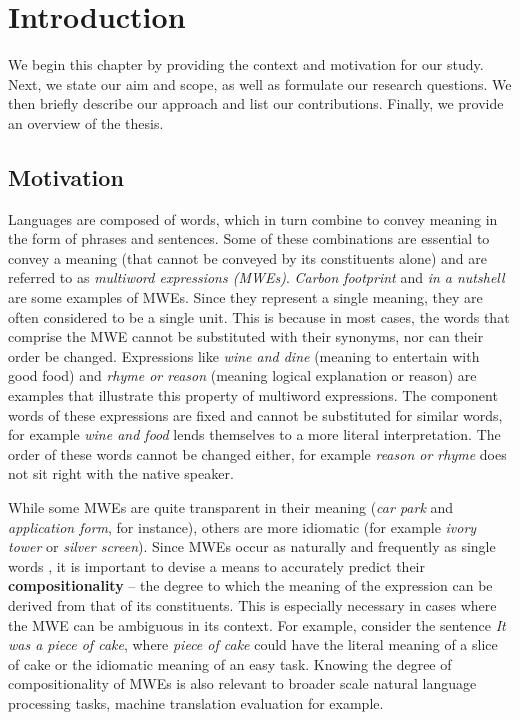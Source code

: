 \chapter{Introduction}
\label{sec:intro}
We begin this chapter by providing the context and motivation for our study. Next, we state our aim and scope, as well as formulate our research questions. We then briefly describe our approach and list our contributions. Finally, we provide an overview of the thesis.
\section{Motivation}
Languages are composed of words, which in turn combine to convey meaning in the form of phrases and sentences. Some of these combinations are essential to convey a meaning (that cannot be conveyed by its constituents alone) and are referred to as \textit{multiword expressions (MWEs)}. \textit{Carbon footprint} and \textit{in a nutshell} are some examples of MWEs. Since they represent a single meaning, they are often considered to be a single unit. This is because in most cases, the words that comprise the MWE cannot be substituted with their synonyms, nor can their order be changed. Expressions like \textit{wine and dine} (meaning to entertain with good food) and \textit{rhyme or reason} (meaning logical explanation or reason) are examples that illustrate this property of multiword expressions. The component words of these expressions are fixed and cannot be substituted for similar words, for example \textit{wine and food} lends themselves to a more literal interpretation. The order of these words cannot be changed either, for example \textit{reason or rhyme} does not sit right with the native speaker.

While some MWEs are quite transparent in their meaning (\textit{car park} and \textit{application form}, for instance), others are more idiomatic (for example \textit{ivory tower} or \textit{silver screen}). Since MWEs occur as naturally and frequently as single words \citep{Jack:1996}, it is important to devise a means to accurately predict their \textbf{compositionality} -- the degree to which the meaning of the expression can be derived from that of its constituents. This is especially necessary in cases where the MWE can be ambiguous in its context. For example, consider the sentence \textit{It was a piece of cake}, where \textit{piece of cake} could have the literal meaning of a slice of cake or the idiomatic meaning of an easy task. Knowing the degree of compositionality of MWEs is also relevant to broader scale natural language processing tasks, machine translation evaluation\citep{Salehi2015b} for example.

